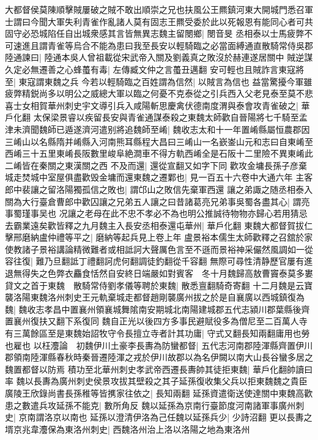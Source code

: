 大都督侯莫陳順擊賊屢破之賊不敢出順崇之兄也扶風公王羆鎮河東大開城門悉召軍士謂曰今聞大軍失利青雀作亂諸人莫有固志王羆受委於此以死報恩有能同心者可共固守必恐城陷任自出城衆感其言皆無異志魏主留閿鄉|{
	閿音旻}
丞相泰以士馬疲弊不可速進且謂青雀等烏合不能為患曰我至長安以輕騎臨之必當面縛通直散騎常侍吳郡陸通諫曰|{
	陸通本吳人曾祖載從宋武帝入關及劉義真之敗沒於赫連遂居關中}
賊逆謀久定必無遷善之心蜂蠆有毒|{
	左傳臧文仲之言蠆丑邁翻}
安可輕也且賊詐言東寇將至|{
	東寇謂東魏之兵}
今若以輕騎臨之百姓謂為信然|{
	以賊言為信也}
益當驚擾今軍雖疲弊精鋭尚多以明公之威總大軍以臨之何憂不克泰從之引兵西入父老見泰至莫不悲喜士女相賀華州刺史宇文導引兵入咸陽斬思慶禽伏德南度渭與泰會攻青雀破之|{
	華戶化翻}
太保梁景睿以疾留長安與青雀通謀泰殺之東魏太師歡自晉陽將七千騎至孟津未濟聞魏師已遁遂濟河遣别將追魏師至崤|{
	魏收志太和十一年置崤縣屬恒農郡因三崤山以名縣隋并崤縣入河南熊耳縣程大昌曰三崤山一名嶔崟山元和志曰自東崤至西崤三十五里東崤長阪數里峻阜絶澗車不得方軌西崤全是石阪十二里險不異東崤此二崤皆在秦關之東漢關之西}
不及而還|{
	還從宣翻又如字下同}
歡攻金墉長孫子彦棄城走焚城中室屋俱盡歡毁金墉而還東魏之遷鄴也|{
	見一百五十六卷中大通六年}
主客郎中裴讓之留洛陽獨孤信之敗也|{
	謂邙山之敗信先棄軍西還}
讓之弟諏之随丞相泰入關為大行臺倉曹郎中歡囚讓之兄弟五人讓之曰昔諸葛亮兄弟事吳蜀各盡其心|{
	謂亮事蜀瑾事吴也}
况讓之老母在此不忠不孝必不為也明公推誠待物物亦歸心若用猜忌去霸業遠矣歡皆釋之九月魏主入長安丞相泰還屯華州|{
	華戶化翻}
東魏大都督賀拔仁擊邢磨納盧仲禮等平之|{
	磨納等起兵見上卷上年}
盧景裕本儒生太師歡釋之召舘於家使教諸子景裕講論精微難者或相詆訶大聲厲色言至不遜而景裕神采儼然風調如一從容往復|{
	難乃旦翻詆丁禮翻訶虎何翻調徒釣翻從千容翻}
無際可尋性清静歷官屢有進退無得失之色弊衣麤食恬然自安終日端嚴如對賓客　冬十月魏歸高敖曹竇泰莫多婁貸文之首于東魏　散騎常侍劉孝儀等聘於東魏|{
	散悉亶翻騎奇寄翻}
十二月魏是云寶襲洛陽東魏洛州刺史王元軌棄城走都督趙剛襲廣州拔之於是自襄廣以西城鎮復為魏|{
	魏收志孝昌中置襄州領襄城舞隂南安期城北南陽建城郡五代志潁川郡葉縣後齊置襄州復扶又翻下系復同}
魏自正光以後四方多事民避賦役多為僧尼至二百萬人寺有三萬餘區至是東魏始詔牧守令長擅立寺者計其功庸|{
	守式又翻長知兩翻庸用也勞也雇也}
以枉灋論　初魏伊川土豪李長夀為防蠻都督|{
	五代志河南郡陸渾縣齊置伊川郡領南陸渾縣春秋時秦晉遷陸渾之戎於伊川故郡以為名伊闕以南大山長谷蠻多居之魏置都督以防焉}
積功至北華州刺史孝武帝西遷長夀帥其徒拒東魏|{
	華戶化翻帥讀曰率}
魏以長夀為廣州刺史侯景攻拔其壁殺之其子延孫復收集父兵以拒東魏魏之貴臣廣陵王欣錄尚書長孫稚等皆㩗家往依之|{
	長知兩翻}
延孫資遣衛送使達關中東魏高歡患之數遣兵攻延孫不能克|{
	數所角反}
魏以延孫為京南行臺節度河南諸軍事廣州刺史|{
	京南謂洛京以南也}
延孫以澄清伊洛為己任魏以延孫兵少|{
	少詩沼翻}
更以長夀之壻京兆韋灋保為東洛州刺史|{
	西魏洛州治上洛以洛陽之地為東洛州}
